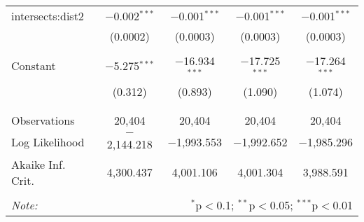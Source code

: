 \begin{table}[!htbp]
\begin{tabular}{@{\extracolsep{-5pt}}lcccc}
 intersects:dist2 & $-$0.002$^{***}$ & $-$0.001$^{***}$ & $-$0.001$^{***}$ & $-$0.001$^{***}$ \\ 
  & (0.0002) & (0.0003) & (0.0003) & (0.0003) \\ 
  & & & & \\ 
 Constant & $-$5.275$^{***}$ & $-$16.934$^{***}$ & $-$17.725$^{***}$ & $-$17.264$^{***}$ \\ 
  & (0.312) & (0.893) & (1.090) & (1.074) \\ 
  & & & & \\ 
\hline \\[-1.8ex] 
Observations & 20,404 & 20,404 & 20,404 & 20,404 \\ 
Log Likelihood & $-$2,144.218 & $-$1,993.553 & $-$1,992.652 & $-$1,985.296 \\ 
Akaike Inf. Crit. & 4,300.437 & 4,001.106 & 4,001.304 & 3,988.591 \\ 
\hline 
\hline \\[-1.8ex] 
\textit{Note:}  & \multicolumn{4}{r}{$^{*}$p$<$0.1; $^{**}$p$<$0.05; $^{***}$p$<$0.01} \\ 
\end{tabular} 
\end{table} 
